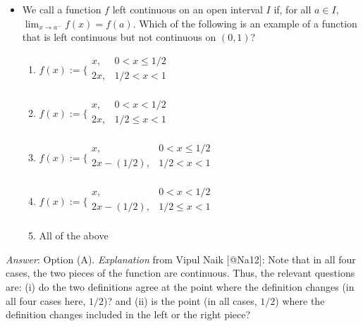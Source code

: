 \begin{itemize}
\item
  We call a function \(f\) left continuous on an open interval \(I\) if,
  for all \(a \in I\), \(\lim_{x \to a^-} f(x) = f(a)\). Which of the
  following is an example of a function that is left continuous but not
  continuous on \((0,1)\)?

  \begin{enumerate}
  \def\labelenumi{(\Alph{enumi})}
  \tightlist
  \item
    \(f(x) := \bigg\lbrace\begin{array}{rl}x, & 0 < x \le 1/2 \\ 2x, & 1/2 < x < 1 \\\end{array}\)
  \item
    \(f(x) := \bigg\lbrace\begin{array}{rl}x, & 0 < x < 1/2 \\ 2x, & 1/2 \le x < 1 \\\end{array}\)
  \item
    \(f(x) := \bigg\lbrace\begin{array}{rl}x, & 0 < x \le 1/2 \\ 2x - (1/2), & 1/2 < x < 1 \\\end{array}\)
  \item
    \(f(x) := \bigg\lbrace\begin{array}{rl}x, & 0 < x < 1/2 \\ 2x - (1/2), & 1/2 \le x < 1 \\\end{array}\)
  \item
    All of the above
  \end{enumerate}
\end{itemize}

\emph{Answer}: Option (A). \emph{Explanation} from Vipul Naik
{[}@Na12{]}: Note that in all four cases, the two pieces of the function
are continuous. Thus, the relevant questions are: (i) do the two
definitions agree at the point where the definition changes (in all four
cases here, \(1/2\))? and (ii) is the point (in all cases, \(1/2\))
where the definition changes included in the left or the right piece?

